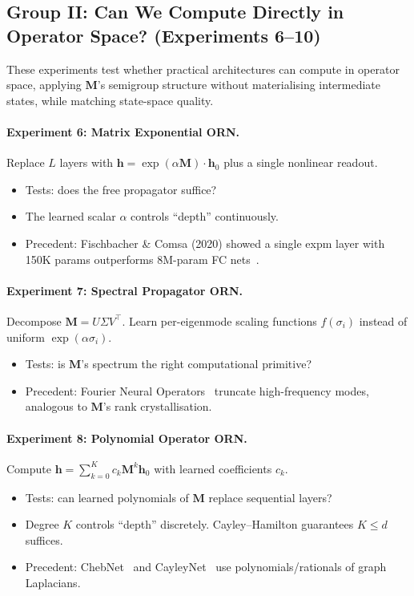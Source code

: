\documentclass[11pt, a4paper]{article}
\newcommand{\M}{\mathbf{M}}
\newcommand{\h}{\mathbf{h}}
\theoremstyle{plain}
\theoremstyle{definition}
\theoremstyle{remark}
\begin{document}
\subsection{Group II: Can We Compute Directly in Operator Space? (Experiments 6--10)}

These experiments test whether practical architectures can compute in operator space, applying $\M$'s semigroup structure without materialising intermediate states, while matching state-space quality.

\paragraph{Experiment 6: Matrix Exponential ORN.}
Replace $L$ layers with $\h = \exp(\alpha \M) \cdot \h_0$ plus a single nonlinear readout.
\begin{itemize}[nosep]
\item Tests: does the free propagator suffice?
\item The learned scalar $\alpha$ controls ``depth'' continuously.
\item Precedent: Fischbacher \& Comsa (2020) showed a single expm layer with 150K params outperforms 8M-param FC nets~\cite{fischbacher2020intelligent}.
\end{itemize}

\paragraph{Experiment 7: Spectral Propagator ORN.}
Decompose $\M = U \Sigma V^\top$.
Learn per-eigenmode scaling functions $f(\sigma_i)$ instead of uniform $\exp(\alpha \sigma_i)$.
\begin{itemize}[nosep]
\item Tests: is $\M$'s spectrum the right computational primitive?
\item Precedent: Fourier Neural Operators~\cite{li2021fno} truncate high-frequency modes, analogous to $\M$'s rank crystallisation.
\end{itemize}

\paragraph{Experiment 8: Polynomial Operator ORN.}
Compute $\h = \sum_{k=0}^{K} c_k \M^k \h_0$ with learned coefficients $c_k$.
\begin{itemize}[nosep]
\item Tests: can learned polynomials of $\M$ replace sequential layers?
\item Degree $K$ controls ``depth'' discretely. Cayley--Hamilton guarantees $K \leq d$ suffices.
\item Precedent: ChebNet~\cite{defferrard2016chebnet} and CayleyNet~\cite{levie2017cayleynet} use polynomials/rationals of graph Laplacians.
\end{itemize}
\end{document}
